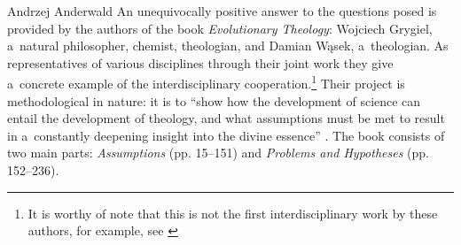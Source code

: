 \begin{newrevengenv}{Andrzej Anderwald}
An unequivocally positive answer to the questions posed is provided by the authors of the book \textit{Evolutionary Theology}: Wojciech Grygiel, a~natural philosopher, chemist, theologian, and Damian Wąsek, a~theologian. As representatives of various disciplines through their joint work they give a~concrete example of the interdisciplinary cooperation.\footnote{It is worthy of note that this is not the first interdisciplinary work by these authors, for example, see 
\parencites[][]{wasek_teologia_2018}[][]{Grygiel2019IntelligentDesign}[][]{grygiel_cognitive_2021}%
} Their project is methodological in nature: it is to ``show how the development of science can entail the development of theology, and what assumptions must be met to result in a~constantly deepening insight into the divine essence'' 
\parencite[][p.12]{grygiel_teologia_2022}. %
 The book consists of two main parts: \textit{Assumptions} (pp. 15–151) and \textit{Problems and Hypotheses} (pp. 152–236).




\end{newrevengenv}
